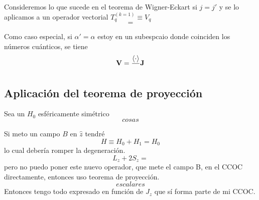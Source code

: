 \documentclass[10pt,oneside]{CBFT_book}
\begin{document}
Consideremos lo que sucede en el teorema de Wigner-Eckart si $j=j'$ y se lo aplicamos a un operador vectorial 
$T_q^{(k=1)} \equiv V_q$
\[
	=
\]

Como caso especial, si $\alpha' =\alpha$ estoy en un subespcaio donde coinciden los números cuánticos, se 
tiene
\[
	\vb{V} = \frac{\Braket{\cdot}}{} \vb{J}
\]

\subsection{Aplicación del teorema de proyección}

Sea un $H_0$ esféricamente simétrico 
\[
	cosas
\]

Si meto un campo $B$ en $\hat{z}$ tendré 
\[
	H \equiv H_0 + H_1 = H_0
\]
lo cual debería romper la degeneración.
\[
	L_z + 2S_z =
\]
pero no puedo poner este nuevo operador, que mete el campo B, en el CCOC directamente, entonces uso teorema 
de proyección.
\[
	escalares
\]
Entonces tengo todo expresado en función de $J_z$ que sí forma parte de mi CCOC.


\end{document}

